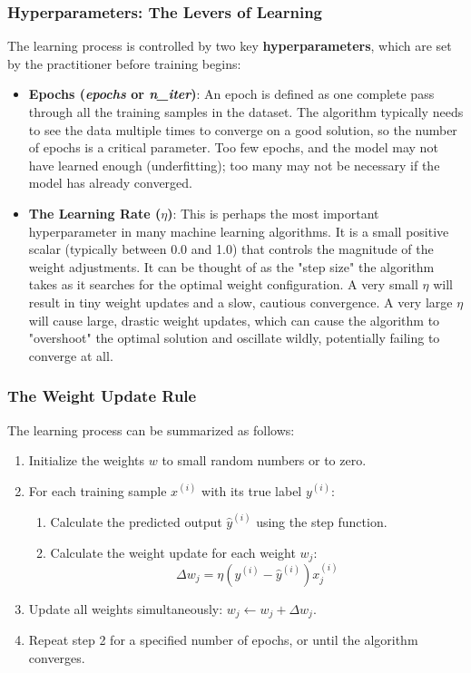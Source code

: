 \subsubsection*{Hyperparameters: The Levers of Learning}
The learning process is controlled by two key \textbf{hyperparameters}, which are set by the practitioner before training begins:
\begin{itemize}
    \item \textbf{Epochs (\textit{epochs} or \textit{n\_iter})}: An epoch is defined as one complete pass through all the training samples in the dataset. The algorithm typically needs to see the data multiple times to converge on a good solution, so the number of epochs is a critical parameter. Too few epochs, and the model may not have learned enough (underfitting); too many may not be necessary if the model has already converged.
    \item \textbf{The Learning Rate ($\eta$)}: This is perhaps the most important hyperparameter in many machine learning algorithms. It is a small positive scalar (typically between 0.0 and 1.0) that controls the magnitude of the weight adjustments. It can be thought of as the "step size" the algorithm takes as it searches for the optimal weight configuration. A very small $\eta$ will result in tiny weight updates and a slow, cautious convergence. A very large $\eta$ will cause large, drastic weight updates, which can cause the algorithm to "overshoot" the optimal solution and oscillate wildly, potentially failing to converge at all.
\end{itemize}

\subsubsection*{The Weight Update Rule}
The learning process can be summarized as follows:
\begin{enumerate}
    \item Initialize the weights $w$ to small random numbers or to zero.
    \item For each training sample $x^{(i)}$ with its true label $y^{(i)}$:
    \begin{enumerate}
        \item Calculate the predicted output $\hat{y}^{(i)}$ using the step function.
        \item Calculate the weight update for each weight $w_j$:
        $$ \Delta w_j = \eta(y^{(i)} - \hat{y}^{(i)})x_j^{(i)} $$
    \end{enumerate}
    \item Update all weights simultaneously: $w_j \leftarrow w_j + \Delta w_j$.
    \item Repeat step 2 for a specified number of epochs, or until the algorithm converges.
\end{enumerate}

